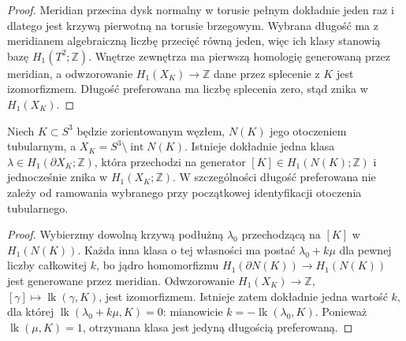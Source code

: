 \begin{proof}
Meridian przecina dysk normalny w torusie pełnym dokładnie
jeden raz i dlatego jest krzywą pierwotną na torusie brzegowym.
Wybrana długość ma z meridianem algebraiczną liczbę przecięć
równą jeden, więc ich klasy stanowią bazę $H_1(T^2;\mathbb Z)$.
Wnętrze zewnętrza ma pierwszą homologię generowaną przez
meridian, a odwzorowanie $H_1(X_K)\to\mathbb Z$ dane przez
splecenie z $K$ jest izomorfizmem. Długość preferowana
ma liczbę splecenia zero, stąd znika w $H_1(X_K)$.
\end{proof}

\begin{stwierdzenie}
Niech $K\subset S^3$ będzie zorientowanym węzłem, $N(K)$ jego
otoczeniem tubularnym, a $X_K=S^3\setminus\operatorname{int}N(K)$.
Istnieje dokładnie jedna klasa $\lambda\in H_1(\partial X_K;\mathbb Z)$,
która przechodzi na generator $[K]\in H_1(N(K);\mathbb Z)$
i jednocześnie znika w $H_1(X_K;\mathbb Z)$.
W szczególności długość preferowana nie zależy od ramowania
wybranego przy początkowej identyfikacji otoczenia tubularnego.
\end{stwierdzenie}

\begin{proof}
Wybierzmy dowolną krzywą podłużną $\lambda_0$ przechodzącą
na $[K]$ w $H_1(N(K))$. Każda inna klasa o tej własności
ma postać $\lambda_0+k\mu$ dla pewnej liczby całkowitej $k$,
bo jądro homomorfizmu $H_1(\partial N(K))\to H_1(N(K))$
jest generowane przez meridian. Odwzorowanie
$H_1(X_K)\to\mathbb Z$, $[\gamma]\mapsto
\operatorname{lk}(\gamma,K)$, jest izomorfizmem.
Istnieje zatem dokładnie jedna wartość $k$, dla której
$\operatorname{lk}(\lambda_0+k\mu,K)=0$: mianowicie
$k=-\operatorname{lk}(\lambda_0,K)$.
Ponieważ $\operatorname{lk}(\mu,K)=1$, otrzymana
klasa jest jedyną długością preferowaną.
\end{proof}

\begin{center}
\end{center}

